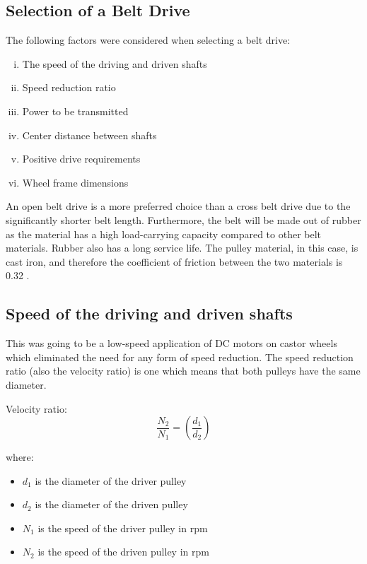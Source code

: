 \subsection{Selection of a Belt Drive}
The following factors were considered when selecting a belt drive:
\begin{enumerate}[i.]
    \item The speed of the driving and driven shafts
    \item Speed reduction ratio
    \item Power to be transmitted
    \item Center distance between shafts
    \item Positive drive requirements
    \item Wheel frame dimensions
\end{enumerate}

An open belt drive is a more preferred choice than a cross belt drive due to the significantly shorter belt length. Furthermore, the belt will be made out of rubber as the material has a high load-carrying capacity compared to other belt materials. Rubber also has a long service life. The pulley material, in this case, is cast iron, and therefore the coefficient of friction between the two materials is 0.32 \cite{noauthor_pulley_nodate}.

\subsection{Speed of the driving and driven shafts}
This was going to be a low-speed application of DC motors on castor wheels which eliminated the need for any form of speed reduction. The speed reduction ratio (also the velocity ratio) is one which means that both pulleys have the same diameter. 

Velocity ratio:
\begin{equation}
\label{eq:3}
    \frac{N_2}{N_1} = \left(\frac{d_1}{d_2}\right)
\end{equation}

where: 
\begin{itemize}
\item \(d_1\)  is the diameter of the driver pulley
\item \(d_2\)  is the diameter of the driven pulley
\item \(N_1\)  is the speed of the driver pulley in rpm
\item \(N_2\)  is the speed of the driven pulley in rpm
\end{itemize}

